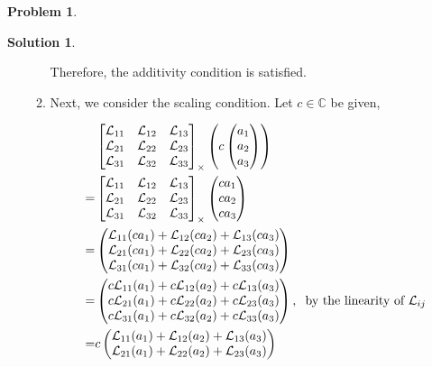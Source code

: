 \documentclass{book}
\theoremstyle{definition}
\newtheorem*{prob*}{Problem}
\newtheorem*{sln*}{Solution}
\newcommand{\lag}{\mathcal{L}}
\begin{document}
\begin{prob*}
\begin{sln*}
\begin{enumerate}
\begin{enumerate}
			Therefore, the additivity condition is satisfied. 
			
			\item Next, we consider the scaling condition. Let $c \in \mathbb{C}$ be given,
			
			
			\begin{align*}
			&\begin{bmatrix}
			\lag_{11} & \lag_{12} & \lag_{13}\\
			\lag_{21} & \lag_{22} & \lag_{23}\\
			\lag_{31} & \lag_{32} & \lag_{33}
			\end{bmatrix}_\times 
			\left(c\begin{pmatrix}
			a_1 \\ a_2 \\ a_3
			\end{pmatrix}\right) \\
			= 
			&\begin{bmatrix}
			\lag_{11} & \lag_{12} & \lag_{13}\\
			\lag_{21} & \lag_{22} & \lag_{23}\\
			\lag_{31} & \lag_{32} & \lag_{33}
			\end{bmatrix}_\times 
			\begin{pmatrix}
			ca_1 \\ ca_2 \\ ca_3
			\end{pmatrix}\\
			=
			&\begin{pmatrix}
			\lag_{11}(ca_1) + \lag_{12}(ca_2) + \lag_{13}(ca_3)\\
			\lag_{21}(ca_1) + \lag_{22}(ca_2) + \lag_{23}(ca_3)\\
			\lag_{31}(ca_1) + \lag_{32}(ca_2) + \lag_{33}(ca_3)
			\end{pmatrix} \\
			=
			& \begin{pmatrix}
			c\lag_{11}(a_1) + c\lag_{12}(a_2) + c\lag_{13}(a_3)\\
			c\lag_{21}(a_1) + c\lag_{22}(a_2) + c\lag_{23}(a_3)\\
			c\lag_{31}(a_1) + c\lag_{32}(a_2) + c\lag_{33}(a_3)
			\end{pmatrix},\hspace{0.2cm}\text{by the linearity of $\lag_{ij}$}\\
			=
			& c\begin{pmatrix}
			\lag_{11}(a_1) + \lag_{12}(a_2) + \lag_{13}(a_3)\\
			\lag_{21}(a_1) + \lag_{22}(a_2) + \lag_{23}(a_3)\\

\end{pmatrix}
\end{align*}
\end{enumerate}
\end{enumerate}
\end{sln*}
\end{prob*}
\end{document}
